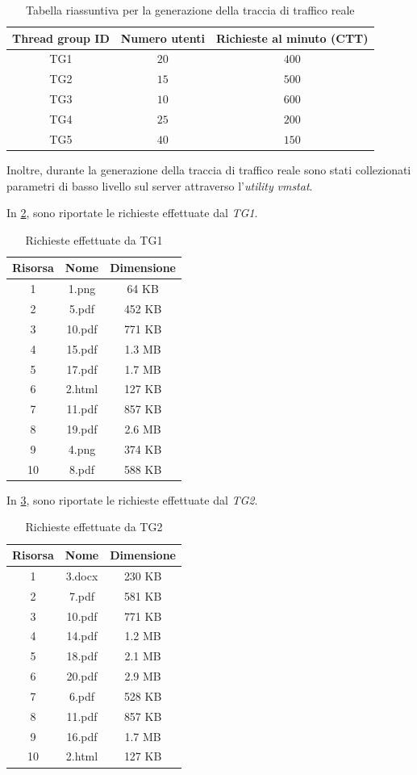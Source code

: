 \begin{table}[H]
\centering
    \begin{tabular}{|c|c|c|}
    \hline
    \multicolumn{1}{|c|}{\textbf{Thread group ID}} &
    \multicolumn{1}{|c|}{\textbf{Numero utenti}} &
    \multicolumn{1}{|c|}{\textbf{Richieste al minuto (CTT)}}
    \tabularnewline \hline

TG1 & $20$ & $400$ \tabularnewline \hline
TG2 & $15$ & $500$ \tabularnewline \hline
TG3 & $10$ & $600$ \tabularnewline \hline
TG4 & $25$ & $200$ \tabularnewline \hline
TG5 & $40$ & $150$ \tabularnewline \hline
\end{tabular}
\caption{Tabella riassuntiva per la generazione della traccia di traffico reale}

\label{tab:wc_real}
\end{table}

Inoltre, durante la generazione della traccia di traffico reale sono stati collezionati parametri di basso livello sul server attraverso l'\textit{utility} \textit{vmstat}.

In \cref{tab:tg1_real}, sono riportate le richieste effettuate dal \textit{TG1}.

\begin{table}[H]
\centering
    \begin{tabular}{|c|c|c|}
    \hline
    \multicolumn{1}{|c|}{\textbf{Risorsa}} &
    \multicolumn{1}{|c|}{\textbf{Nome}} &
    \multicolumn{1}{|c|}{\textbf{Dimensione}}
    \tabularnewline \hline

1 & 1.png & 64 KB \tabularnewline \hline
2 & 5.pdf & 452 KB \tabularnewline \hline
3 & 10.pdf & 771 KB \tabularnewline \hline
4 & 15.pdf & 1.3 MB \tabularnewline \hline
5 & 17.pdf & 1.7 MB \tabularnewline \hline
6 & 2.html & 127 KB \tabularnewline \hline
7 & 11.pdf & 857 KB \tabularnewline \hline
8 & 19.pdf & 2.6 MB \tabularnewline \hline
9 & 4.png & 374 KB \tabularnewline \hline
10 & 8.pdf & 588 KB \tabularnewline \hline
\end{tabular}
\caption{Richieste effettuate da TG1}
\label{tab:tg1_real}
\end{table}

In \cref{tab:tg2_real}, sono riportate le richieste effettuate dal \textit{TG2}.

\begin{table}[H]
\centering
    \begin{tabular}{|c|c|c|}
    \hline
    \multicolumn{1}{|c|}{\textbf{Risorsa}} &
    \multicolumn{1}{|c|}{\textbf{Nome}} &
    \multicolumn{1}{|c|}{\textbf{Dimensione}}
    \tabularnewline \hline

1 & 3.docx & 230 KB   \tabularnewline \hline
2 & 7.pdf & 581 KB  \tabularnewline \hline
3 & 10.pdf & 771 KB \tabularnewline \hline
4 & 14.pdf & 1.2 MB \tabularnewline \hline
5 & 18.pdf & 2.1 MB \tabularnewline \hline
6 & 20.pdf & 2.9 MB \tabularnewline \hline
7 & 6.pdf & 528 KB  \tabularnewline \hline
8 & 11.pdf & 857 KB \tabularnewline \hline
9 & 16.pdf & 1.7 MB \tabularnewline \hline
10 & 2.html & 127 KB \tabularnewline \hline
\end{tabular}
\caption{Richieste effettuate da TG2}
\label{tab:tg2_real}
\end{table}

